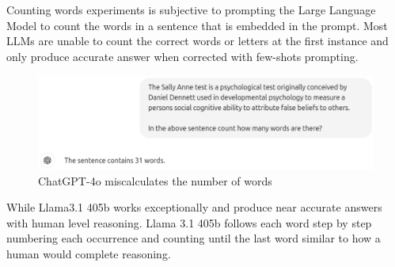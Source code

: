 \documentclass[pdflatex,sn-mathphys-num]{sn-jnl}%
\theoremstyle{thmstyleone}%
\theoremstyle{thmstyletwo}%
\theoremstyle{thmstylethree}%
\begin{document}
\begin{appendices}
\renewcommand{\thefigure}{\arabic{figure}}
\section{}\label{secA}

Counting words experiments is subjective to prompting the Large Language Model to count the words in a sentence that is embedded in the prompt. Most LLMs are unable to count the correct words or letters at the first instance and only produce accurate answer when corrected with few-shots prompting.
\begin{figure}[H]
    \centering
    \includegraphics[scale=0.50]{figures/countingwordsmishap.eps}
    \captionsetup{justification=centering}
    \caption{ChatGPT-4o miscalculates the number of words}
    \label{fig:Rubik's cube failure claude}
\end{figure}

While Llama3.1 405b works exceptionally and produce near accurate answers with human level reasoning. Llama 3.1 405b follows each word step by step numbering each occurrence and counting until the last word similar to how a human would complete reasoning.
\section{}\label{secB}



\end{appendices}
\end{document}
